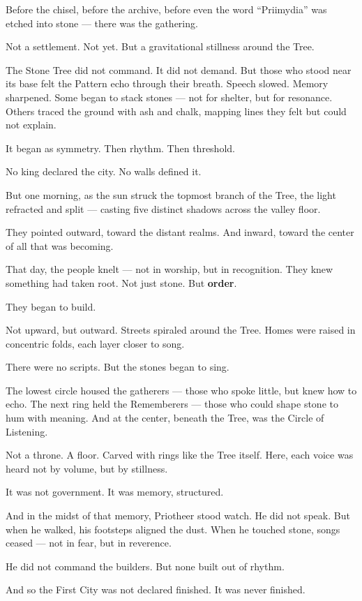\documentclass[9pt]{article}
\begin{document}
Before the chisel, before the archive, before even the word “Priimydia” was etched into stone — there was the gathering.

Not a settlement. Not yet.  
But a gravitational stillness around the Tree.

The Stone Tree did not command. It did not demand.  
But those who stood near its base felt the Pattern echo through their breath.  
Speech slowed. Memory sharpened.  
Some began to stack stones — not for shelter, but for resonance.  
Others traced the ground with ash and chalk, mapping lines they felt but could not explain.

It began as symmetry.  
Then rhythm.  
Then threshold.

No king declared the city.  
No walls defined it.

But one morning, as the sun struck the topmost branch of the Tree, the light refracted and split —  
casting five distinct shadows across the valley floor.

They pointed outward, toward the distant realms.  
And inward, toward the center of all that was becoming.

That day, the people knelt — not in worship, but in recognition.  
They knew something had taken root.  
Not just stone.  
But \textbf{order}.

They began to build.

Not upward, but outward.  
Streets spiraled around the Tree.  
Homes were raised in concentric folds, each layer closer to song.

There were no scripts.  
But the stones began to sing.

The lowest circle housed the gatherers — those who spoke little, but knew how to echo.  
The next ring held the Rememberers — those who could shape stone to hum with meaning.  
And at the center, beneath the Tree, was the Circle of Listening.

Not a throne.  
A floor.  
Carved with rings like the Tree itself.  
Here, each voice was heard not by volume, but by stillness.

It was not government.  
It was memory, structured.

And in the midst of that memory, Priotheer stood watch.  
He did not speak.  
But when he walked, his footsteps aligned the dust.  
When he touched stone, songs ceased — not in fear, but in reverence.

He did not command the builders.  
But none built out of rhythm.

And so the First City was not declared finished.  
It was never finished.
\end{document}
